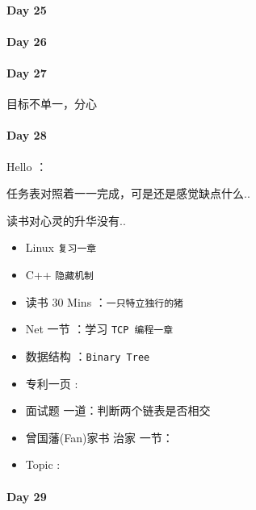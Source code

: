 \documentclass[UTF8,a4paper,8pt]{ctexart}
\begin{document}
 	 \paragraph{Day 25      \quad     }
 	 \paragraph{Day 26      \quad     }
 	 \paragraph{Day 27      \quad     }
	 	 目标不单一，分心
 	 \paragraph{Day 28      \quad     }
	 	 Hello ：
	 	 
	 	 任务表对照着一一完成，可是还是感觉缺点什么..
	 	 
		 读书对心灵的升华没有..
	 	 \begin{itemize}[itemindent = 1em]
	 	 	\renewcommand\labelitemi{\makebox[0pt][l]{$\square$}\hspace{1em}} 
	 	 	\renewcommand\labelitemi{\makebox[0pt][l]{$\square$}\raisebox{.15ex}{\hspace{0.1em}$\checkmark$}}	 	
	 	 	\item   Linux \verb|复习一章|
	 	 	\item   C++   \verb|隐藏机制|
	 	 	
	 	 	\item   读书  30 Mins	：\verb|一只特立独行的猪|
	 	 	\item   Net 一节 ：学习 \verb|TCP 编程一章|	
	 	 	
	 	 	\renewcommand\labelitemi{\makebox[0pt][l]{$\square$}\hspace{1em}} 
	 	 	\item   数据结构 ：\verb|Binary Tree| 
	 	 	\item   专利一页 :	
	 	 	\item   面试题 一道：判断两个链表是否相交
	 	 	
	 	 	\renewcommand\labelitemi{\makebox[0pt][l]{$\square$}\raisebox{.15ex}{\hspace{0.1em}$\checkmark$}}
	 	 	\item   曾国藩(Fan)家书 治家 一节：
	 	 	\item   Topic :
	 	 \end{itemize}
 	 \paragraph{Day 29      \quad     }   
	 	 
\end{document}
